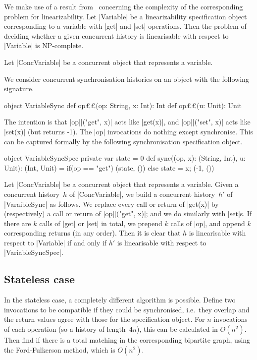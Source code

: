 We make use of a result from~\cite{???} concerning the complexity of the
corresponding problem for linearizability.  Let |Variable| be a
linearizability specification object corresponding to a variable with |get|
and |set| operations.  Then the problem of deciding whether a given concurrent
history is linearisable with respect to |Variable| is NP-complete.

Let |ConcVariable| be a concurrent object that represents a variable.  

We consider concurrent synchronisation histories on an object with the
following signature.   
\begin{scala}
object VariableSync{
  def op££(op: String, x: Int): Int
  def op££(u: Unit): Unit
} 
\end{scala}
%
The intention is that |op||("get", x)| acts like |get(x)|, and
|op||("set", x)| acts like |set(x)| (but returns -1).  The |op|
invocations do nothing except synchronise.  This can be captured formally by
the following synchronisation specification object.

\begin{scala}
object VariableSyncSpec{
  private var state = 0
  def sync((op, x): (String, Int), u: Unit): (Int, Unit) = 
    if(op == "get") (state, ()) else{ state = x; (-1, ()) }
}
\end{scala}


Let |ConcVariable| be a concurrent object that represents a variable.  Given a
concurrent history~$h$ of |ConcVariable|, we build a concurrent history~$h'$
of |VaraibleSync| as follows.  We replace every call or return of |get(x)| by
(respectively) a call or return of |op||("get", x)|; and we do similarly
with |set|s.  If there are $k$ calls of |get| or |set| in total, we prepend
$k$ calls of |op|, and append $k$ corresponding returns (in any order).
Then it is clear that $h$ is linearisable with respect to |Variable| if and
only if $h'$ is linearisable with respect to |VariableSyncSpec|.


\subsection{Stateless case}

In the stateless case, a completely different algorithm is possible.  Define
two invocations to be compatible if they could be synchronised, i.e.~they
overlap and the return values agree with those for the specification object.
For $n$ invocations of each operation (so a history of length~$4n$), this can
be calculated in $O(n^2)$.  Then find if there is a total matching in the
corresponding bipartite graph, using the Ford-Fulkerson method, which is
$O(n^2)$.
